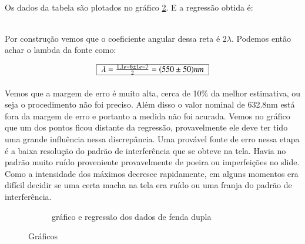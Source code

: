 \documentclass[a4paper,11pt]{article}
\newcommand{\MyBox}[1]
{
	\begin{tabular}{|l|}\hline
	  #1 \\ \hline	    
	\end{tabular} 	
}
\begin{document}
\paragraph{}Os dados da tabela são plotados no gráfico \ref{graph-1}. 
E a regressão obtida é:

\begin{equation}
 
\end{equation}

\paragraph{}Por construção vemos que o coeficiente angular dessa reta é
 2$\lambda$. Podemos então achar o lambda da fonte como:

\begin{displaymath}
\MyBox{$\lambda =\frac{ 1.1e-6 \pm 1e-7}{2} = (550 \pm 50)nm $} 
\end{displaymath}

\paragraph{}Vemos que a margem de erro é muito alta, cerca de 10\% da melhor
estimativa, ou seja o procedimento não foi preciso. Além disso o valor
nominal de 632.8nm está fora da margem de erro e portanto a medida não
foi acurada. Vemos no gráfico que um dos pontos ficou distante da regressão,
provavelmente ele deve ter tido uma grande influência nessa discrepância.
Uma provável fonte de erro nessa etapa é a baixa resolução do padrão de
interferência que se obteve na tela. Havia no padrão muito ruído proveniente
provavelmente de poeira ou imperfeições no slide. Como a intensidade dos máximos
decresce rapidamente, em alguns momentos era difícil decidir se uma certa 
macha na tela era ruído ou uma franja do padrão de interferência.
\FloatBarrier
  

\begin{figure}[!htp]

    \begin{subfigure}[!htp]{0.3\textwidth}
        
        \caption{gráfico e regressão dos dados de fenda dupla}
        \label{graph-1}  
    \end{subfigure}
   
    \caption{Gráficos}
    
\end{figure}


\FloatBarrier
\end{document}
